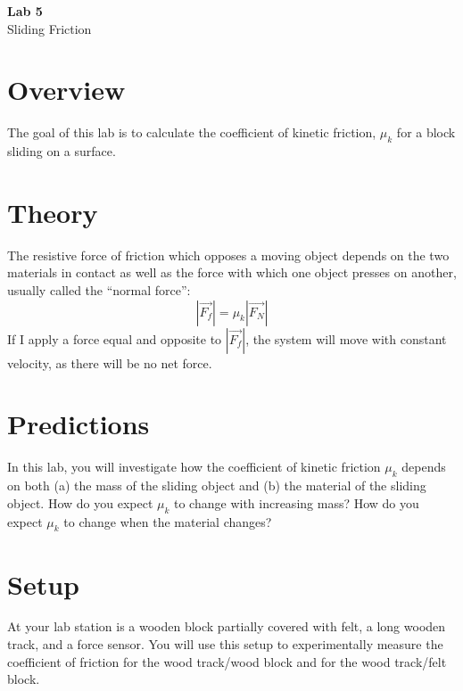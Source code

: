 \documentclass{article}
\begin{document}
\fancyfoot[C]{\thepage}
\vspace*{0cm}
\begin{center}
	{\LARGE \textbf{Lab 5}}\\
	\vspace{.25cm}
	{\Large Sliding Friction}
\end{center}

\section*{Overview}
The goal of this lab is to calculate the coefficient of kinetic friction, $\mu_k$ for a block sliding on a surface.
\section*{Theory}
The resistive force of friction which opposes a moving object depends on the two materials in contact as well as the force with which one object presses on another, usually called the ``normal force'':
\begin{equation}
|\vec{F_f}|=\mu_k|\vec{F_N}|
\end{equation}
If I apply a force equal and opposite to $|\vec{F_f}|$, the system will move with constant velocity, as there will be no net force.
\section*{Predictions}
In this lab, you will investigate how the coefficient of kinetic friction $\mu_k$ depends on both (a) the mass of the sliding object and (b) the material of the sliding object. How do you expect $\mu_k$ to change with increasing mass? How do you expect $\mu_k$ to change when the material changes?
\section*{Setup}
At your lab station is a wooden block partially covered with felt, a long wooden track, and a force sensor. You will use this setup to experimentally measure the coefficient of friction for the wood track/wood block and for the wood track/felt block.
\end{document}
